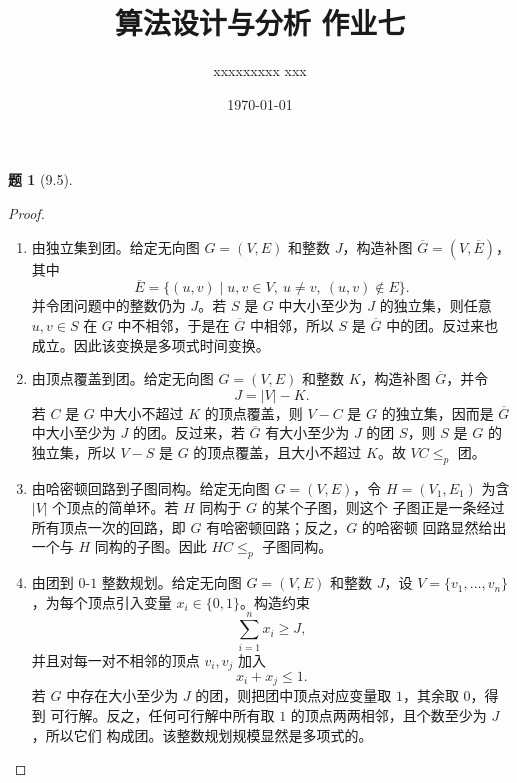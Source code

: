 \documentclass[11pt, a4paper]{article}
\title{算法设计与分析 作业七}
\author{xxxxxxxxx xxx}
\date{\today}
\newtheorem{problem}{题}
\begin{document}
\maketitle

\begin{problem}[9.5]
\end{problem}

\begin{proof}
    \begin{enumerate}[label=(\arabic*)]
        \item 由独立集到团。给定无向图 $G=(V,E)$ 和整数 $J$，构造补图
        $\overline{G}=(V,\overline{E})$，其中
        \[
            \overline{E}=\{(u,v)\mid u,v\in V,\ u\ne v,\ (u,v)\notin E\}.
        \]
        并令团问题中的整数仍为 $J$。若 $S$ 是 $G$ 中大小至少为 $J$ 的独立集，则任意
        $u,v\in S$ 在 $G$ 中不相邻，于是在 $\overline{G}$ 中相邻，所以 $S$ 是
        $\overline{G}$ 中的团。反过来也成立。因此该变换是多项式时间变换。

        \item 由顶点覆盖到团。给定无向图 $G=(V,E)$ 和整数 $K$，构造补图
        $\overline{G}$，并令
        \[
            J=|V|-K.
        \]
        若 $C$ 是 $G$ 中大小不超过 $K$ 的顶点覆盖，则 $V-C$ 是 $G$ 的独立集，因而是
        $\overline{G}$ 中大小至少为 $J$ 的团。反过来，若 $\overline{G}$ 有大小至少为
        $J$ 的团 $S$，则 $S$ 是 $G$ 的独立集，所以 $V-S$ 是 $G$ 的顶点覆盖，且大小不超过
        $K$。故 $VC\le_p$ 团。

        \item 由哈密顿回路到子图同构。给定无向图 $G=(V,E)$，令
        $H=(V_1,E_1)$ 为含 $|V|$ 个顶点的简单环。若 $H$ 同构于 $G$ 的某个子图，则这个
        子图正是一条经过所有顶点一次的回路，即 $G$ 有哈密顿回路；反之，$G$ 的哈密顿
        回路显然给出一个与 $H$ 同构的子图。因此 $HC\le_p$ 子图同构。

        \item 由团到 $0$-$1$ 整数规划。给定无向图 $G=(V,E)$ 和整数 $J$，设
        $V=\{v_1,\ldots,v_n\}$，为每个顶点引入变量 $x_i\in\{0,1\}$。构造约束
        \[
            \sum_{i=1}^n x_i\ge J,
        \]
        并且对每一对不相邻的顶点 $v_i,v_j$ 加入
        \[
            x_i+x_j\le 1.
        \]
        若 $G$ 中存在大小至少为 $J$ 的团，则把团中顶点对应变量取 $1$，其余取 $0$，得到
        可行解。反之，任何可行解中所有取 $1$ 的顶点两两相邻，且个数至少为 $J$，所以它们
        构成团。该整数规划规模显然是多项式的。
    \end{enumerate}
\end{proof}
\end{document}
